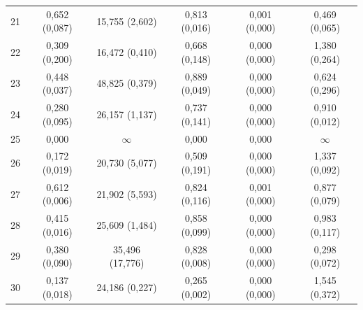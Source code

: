 \begin{tabular}{l c c c c c}
21 & 0,652 (0,087) & 15,755 (2,602) & 0,813 (0,016) & 0,001 (0,000) & 0,469 (0,065) \\
22 & 0,309 (0,200) & 16,472 (0,410) & 0,668 (0,148) & 0,000 (0,000) & 1,380 (0,264) \\
23 & 0,448 (0,037) & 48,825 (0,379) & 0,889 (0,049) & 0,000 (0,000) & 0,624 (0,296) \\
24 & 0,280 (0,095) & 26,157 (1,137) & 0,737 (0,141) & 0,000 (0,000) & 0,910 (0,012) \\
25 & 0,000 & $\infty$ & 0,000 & 0,000 & $\infty$ \\
26 & 0,172 (0,019) & 20,730 (5,077) & 0,509 (0,191) & 0,000 (0,000) & 1,337 (0,092) \\
27 & 0,612 (0,006) & 21,902 (5,593) & 0,824 (0,116) & 0,001 (0,000) & 0,877 (0,079) \\
28 & 0,415 (0,016) & 25,609 (1,484) & 0,858 (0,099) & 0,000 (0,000) & 0,983 (0,117) \\
29 & 0,380 (0,090) & 35,496 (17,776) & 0,828 (0,008) & 0,000 (0,000) & 0,298 (0,072) \\
30 & 0,137 (0,018) & 24,186 (0,227) & 0,265 (0,002) & 0,000 (0,000) & 1,545 (0,372) \\
\hline 
 \end{tabular}
